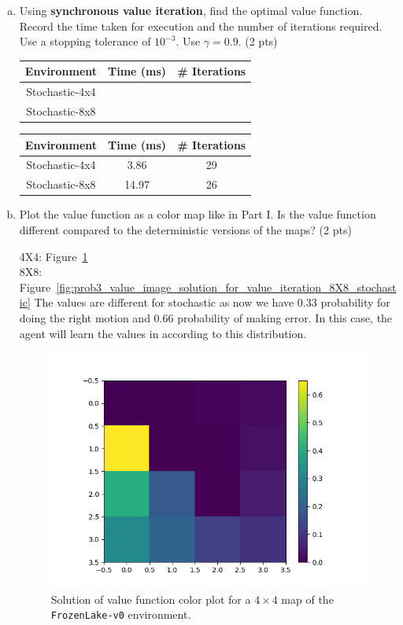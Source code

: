 \documentclass[12pt]{article}
\begin{document}
\begin{enumerate}[a)]
\item Using \textbf{synchronous value iteration}, find the optimal value function. Record
  the time taken for execution and the number of iterations required. Use a
  stopping tolerance of $10^{-3}$. Use $\gamma=0.9$. (2 pts)
\begin{center}
  \begin{tabular}{|c|c|c|}\hline
    {\bf Environment} & {\bf Time (ms)} & {\bf \# Iterations} \\ \hline
    Stochastic-4x4 & & \\ \hline
    Stochastic-8x8 & & \\ \hline
  \end{tabular}
\end{center}

\begin{solution}
\begin{center}
  \begin{tabular}{|c|c|c|}\hline
    {\bf Environment} & {\bf Time (ms)} & {\bf \# Iterations} \\ \hline
    Stochastic-4x4 & 3.86 & 29 \\ \hline
    Stochastic-8x8 & 14.97 & 26 \\ \hline
  \end{tabular}
\end{center}
\end{solution}

\item Plot the value function as a color map like in Part I. Is the
  value function different compared to the deterministic versions of
  the maps? (2 pts)
\begin{solution}
4X4: Figure~\ref{fig:prob3_value_image_solution_for_value_iteration_stochastic} \\
8X8: Figure~\ref{fig:prob3_value_image_solution_for_value_iteration_8X8_stochastic}
The values are different for stochastic as now we have 0.33 probability for doing the right motion and 0.66 probability of making error. In this case, the agent will learn the values in according to this distribution.
\end{solution}

\begin{figure}[h]
  \centering
  \includegraphics[width=.5\textwidth]{figures/stochastic_sync_value_iteration_value_map.png}
  \caption{\label{fig:prob3_value_image_solution_for_value_iteration_stochastic} Solution of value function color plot for a $4 \times 4$ map of the \texttt{FrozenLake-v0} environment.}
\end{figure}
\FloatBarrier


\end{enumerate}
\end{document}
